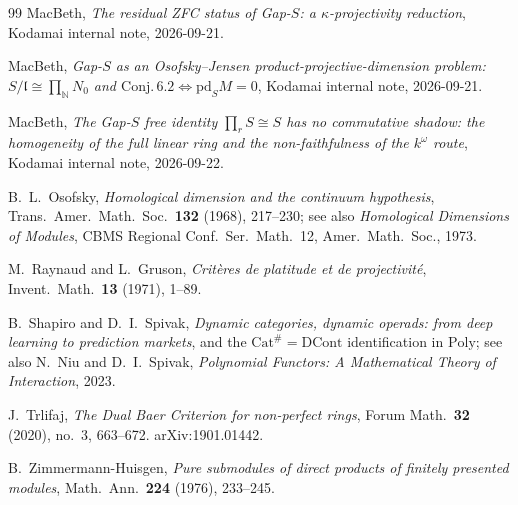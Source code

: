 \documentclass[11pt,reqno]{amsart}
\theoremstyle{plain}
\theoremstyle{definition}
\theoremstyle{remark}
\newcommand{\pd}{\mathrm{pd}}
\newcommand{\N}{\mathbb{N}}
\begin{document}
\begin{thebibliography}{99}
 MacBeth, \emph{The residual ZFC status of Gap-$S$: a $\kappa$-projectivity reduction}, Kodamai internal note, 2026-09-21.

 MacBeth, \emph{Gap-$S$ as an Osofsky--Jensen product-projective-dimension problem: $S/\mathfrak l\cong\prod_{\N}N_0$ and $\mathrm{Conj.}\,6.2\Leftrightarrow\pd_S M=0$}, Kodamai internal note, 2026-09-21.

 MacBeth, \emph{The Gap-$S$ free identity $\prod_r S\cong S$ has no commutative shadow: the homogeneity of the full linear ring and the non-faithfulness of the $k^{\omega}$ route}, Kodamai internal note, 2026-09-22.

 B.~L.~Osofsky, \emph{Homological dimension and the continuum hypothesis}, Trans.\ Amer.\ Math.\ Soc.\ \textbf{132} (1968), 217--230; see also \emph{Homological Dimensions of Modules}, CBMS Regional Conf.\ Ser.\ Math.\ 12, Amer.\ Math.\ Soc., 1973.

 M.~Raynaud and L.~Gruson, \emph{Crit\`eres de platitude et de projectivit\'e}, Invent.\ Math.\ \textbf{13} (1971), 1--89.

 B.~Shapiro and D.~I.~Spivak, \emph{Dynamic categories, dynamic operads: from deep learning to prediction markets}, and the $\mathrm{Cat}^{\#}=\mathrm{DCont}$ identification in $\mathrm{Poly}$; see also N.~Niu and D.~I.~Spivak, \emph{Polynomial Functors: A Mathematical Theory of Interaction}, 2023.

 J.~Trlifaj, \emph{The Dual Baer Criterion for non-perfect rings}, Forum Math.\ \textbf{32} (2020), no.~3, 663--672. arXiv:1901.01442.

 B.~Zimmermann-Huisgen, \emph{Pure submodules of direct products of finitely presented modules}, Math.\ Ann.\ \textbf{224} (1976), 233--245.

\end{thebibliography}
\end{document}
